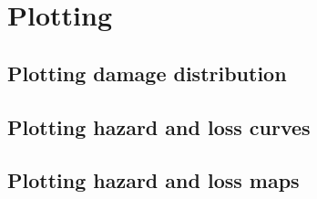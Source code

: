 \chapter{Plotting}
\label{chap:plotting}


	\section{Plotting damage distribution}
	\label{sec:plot-damage}
	

	\section{Plotting hazard and loss curves}
	\label{sec:plot-curves}
	

	\section{Plotting hazard and loss maps}
	\label{sec:plot-maps}
	
